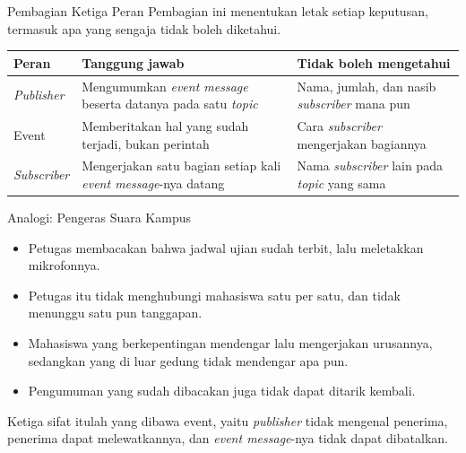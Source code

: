 \documentclass[aspectratio=169, table, 12pt]{beamer}
\begin{document}
\begin{frame}{{\Large Pembagian Ketiga Peran}}
  \vspace{6pt}
  {\small Pembagian ini menentukan letak setiap keputusan, termasuk apa yang
  sengaja tidak boleh diketahui.}

  \vspace{6pt}
  \centering
  \small
  \begin{tabularx}{0.96\textwidth}{|l|X|X|}
    \hline
    \textbf{Peran} & \textbf{Tanggung jawab} & \textbf{Tidak boleh mengetahui} \\
    \hline
    \textit{Publisher} & Mengumumkan \textit{event message} beserta datanya pada satu \textit{topic} & Nama, jumlah, dan nasib \textit{subscriber} mana pun \\
    \hline
    Event & Memberitakan hal yang sudah terjadi, bukan perintah & Cara \textit{subscriber} mengerjakan bagiannya \\
    \hline
    \textit{Subscriber} & Mengerjakan satu bagian setiap kali \textit{event message}-nya datang & Nama \textit{subscriber} lain pada \textit{topic} yang sama \\
    \hline
  \end{tabularx}
\end{frame}

\begin{frame}{{\Large Analogi: Pengeras Suara Kampus}}
  \vspace{10pt}
  \begin{itemize}\small
    \item Petugas membacakan bahwa jadwal ujian sudah terbit, lalu meletakkan
          mikrofonnya.
    \item Petugas itu tidak menghubungi mahasiswa satu per satu, dan tidak
          menunggu satu pun tanggapan.
    \item Mahasiswa yang berkepentingan mendengar lalu mengerjakan urusannya,
          sedangkan yang di luar gedung tidak mendengar apa pun.
    \item Pengumuman yang sudah dibacakan juga tidak dapat ditarik kembali.
  \end{itemize}

  \vspace{10pt}
  {\small Ketiga sifat itulah yang dibawa event, yaitu \textit{publisher} tidak mengenal
  penerima, penerima dapat melewatkannya, dan \textit{event message}-nya tidak
  dapat dibatalkan.}

\end{frame}
\end{document}
